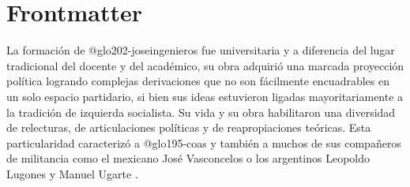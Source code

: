 \newif\ifPDF%
\newif\ifBNPDF%
\newif\ifEPUB%
\newif\ifHTML%
\newif\ifHTMLcinco%
\newif\ifJATS%
\newif\ifTEI%
\newif\ifDocBook%
\newif\ifODT%

 \BNPDFtrue





\ifODT
\usepackage[unicode,hyperindex=true]{hyperref}
\else
	\ifPDF
	\usepackage[hyphenation,homeoarchy,draft,homeoarchywordcolor=yellow,homeoarchycharcolor=yellow]{impnattypo}
	\usepackage[allcolors=magenta,colorlinks]{hyperref}
	\usepackage{hyperxmp}
	
	\else
		\ifBNPDF
		\usepackage[cam,width=18truecm,height=25.5truecm,center]{crop}
		\usepackage[hidelinks]{hyperref}
		\usepackage{hyperxmp}
		
		\else
			\ifEPUB
			\usepackage[hyperindex=true,allcolors=magenta,colorlinks]{hyperref}
			\fi
		\fi
	\fi
\fi


\frontmatter

\ifEPUB%
	\ifdefined\HCode
	\phantomsection
	\addcontentsline{toc}{section}{Portada}
	\coverimage{./media/cover.png}
	\clearpage
	\fi
\fi

\ifPDF

\else
	\ifBNPDF
	
	\fi
\fi

\ifPDF
\Author{Sumario}
\else
	\ifBNPDF
	\fi
\fi

\tableofcontents

\chapter{Frontmatter}

La formación de \gls{@glo202-joseingenieros} fue universitaria y a diferencia del lugar tradicional del docente y del académico, su obra adquirió una marcada proyección política logrando complejas derivaciones que no son fácilmente encuadrables en un solo espacio partidario, si bien sus ideas estuvieron ligadas mayoritariamente a la tradición de izquierda socialista. Su vida y su obra habilitaron una diversidad de relecturas, de articulaciones políticas y de reapropiaciones teóricas. Esta particularidad caracterizó a \gls{@glo195-coas} y también a muchos de sus compañeros de militancia como el mexicano José Vasconcelos o los argentinos Leopoldo Lugones y Manuel Ugarte \parencite{@2762-MONSIVAIS1994}.


